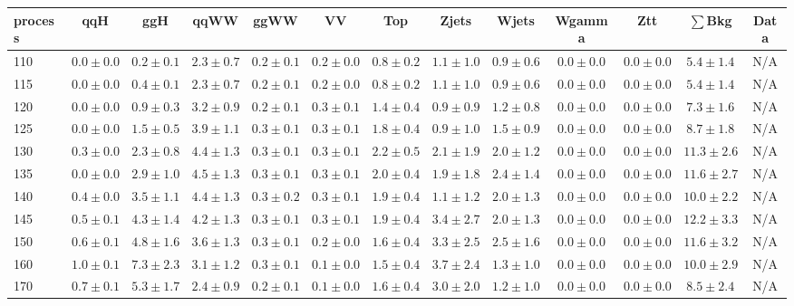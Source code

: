 \begin{table}
{%
 \tiny
 \begin{center}
 \begin{tabular}{l | c c | c c c c c c c c  | c c}
 \hline
 process & qqH & ggH & qqWW & ggWW & VV & Top & Zjets & Wjets & Wgamma & Ztt & $\sum$Bkg & Data \\
 \hline
110 & $0.0\pm0.0$ & $0.2\pm0.1$ & $2.3\pm0.7$ & $0.2\pm0.1$ & $0.2\pm0.0$ & $0.8\pm0.2$ & $1.1\pm1.0$ & $0.9\pm0.6$ & $0.0\pm0.0$ & $0.0\pm0.0$ & $5.4\pm1.4$ & N/A \\
115 & $0.0\pm0.0$ & $0.4\pm0.1$ & $2.3\pm0.7$ & $0.2\pm0.1$ & $0.2\pm0.0$ & $0.8\pm0.2$ & $1.1\pm1.0$ & $0.9\pm0.6$ & $0.0\pm0.0$ & $0.0\pm0.0$ & $5.4\pm1.4$ & N/A \\
120 & $0.0\pm0.0$ & $0.9\pm0.3$ & $3.2\pm0.9$ & $0.2\pm0.1$ & $0.3\pm0.1$ & $1.4\pm0.4$ & $0.9\pm0.9$ & $1.2\pm0.8$ & $0.0\pm0.0$ & $0.0\pm0.0$ & $7.3\pm1.6$ & N/A \\
125 & $0.0\pm0.0$ & $1.5\pm0.5$ & $3.9\pm1.1$ & $0.3\pm0.1$ & $0.3\pm0.1$ & $1.8\pm0.4$ & $0.9\pm1.0$ & $1.5\pm0.9$ & $0.0\pm0.0$ & $0.0\pm0.0$ & $8.7\pm1.8$ & N/A \\
130 & $0.3\pm0.0$ & $2.3\pm0.8$ & $4.4\pm1.3$ & $0.3\pm0.1$ & $0.3\pm0.1$ & $2.2\pm0.5$ & $2.1\pm1.9$ & $2.0\pm1.2$ & $0.0\pm0.0$ & $0.0\pm0.0$ & $11.3\pm2.6$ & N/A \\
135 & $0.0\pm0.0$ & $2.9\pm1.0$ & $4.5\pm1.3$ & $0.3\pm0.1$ & $0.3\pm0.1$ & $2.0\pm0.4$ & $1.9\pm1.8$ & $2.4\pm1.4$ & $0.0\pm0.0$ & $0.0\pm0.0$ & $11.6\pm2.7$ & N/A \\
140 & $0.4\pm0.0$ & $3.5\pm1.1$ & $4.4\pm1.3$ & $0.3\pm0.2$ & $0.3\pm0.1$ & $1.9\pm0.4$ & $1.1\pm1.2$ & $2.0\pm1.3$ & $0.0\pm0.0$ & $0.0\pm0.0$ & $10.0\pm2.2$ & N/A \\
145 & $0.5\pm0.1$ & $4.3\pm1.4$ & $4.2\pm1.3$ & $0.3\pm0.1$ & $0.3\pm0.1$ & $1.9\pm0.4$ & $3.4\pm2.7$ & $2.0\pm1.3$ & $0.0\pm0.0$ & $0.0\pm0.0$ & $12.2\pm3.3$ & N/A \\
150 & $0.6\pm0.1$ & $4.8\pm1.6$ & $3.6\pm1.3$ & $0.3\pm0.1$ & $0.2\pm0.0$ & $1.6\pm0.4$ & $3.3\pm2.5$ & $2.5\pm1.6$ & $0.0\pm0.0$ & $0.0\pm0.0$ & $11.6\pm3.2$ & N/A \\
160 & $1.0\pm0.1$ & $7.3\pm2.3$ & $3.1\pm1.2$ & $0.3\pm0.1$ & $0.1\pm0.0$ & $1.5\pm0.4$ & $3.7\pm2.4$ & $1.3\pm1.0$ & $0.0\pm0.0$ & $0.0\pm0.0$ & $10.0\pm2.9$ & N/A \\
170 & $0.7\pm0.1$ & $5.3\pm1.7$ & $2.4\pm0.9$ & $0.2\pm0.1$ & $0.1\pm0.0$ & $1.6\pm0.4$ & $3.0\pm2.0$ & $1.2\pm1.0$ & $0.0\pm0.0$ & $0.0\pm0.0$ & $8.5\pm2.4$ & N/A \\

\end{tabular}
\end{center}}
\end{table}
